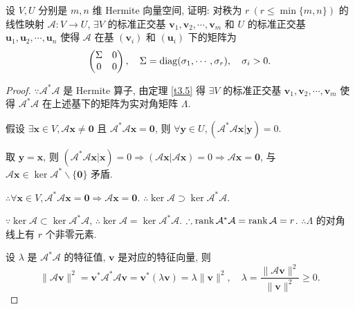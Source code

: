 \documentclass{ctexart}
\begin{document}
\begin{exercisec}%
    设 $V,U$ 分别是 $m,n$ 维 Hermite 向量空间, 证明: 对秩为 $r\ (r\leq\min\{m,n\})$ 的线性映射 $\mathcal{A}:V\to U$, $\exists V$ 的标准正交基 $\boldsymbol{v}_1,\boldsymbol{v}_2,\cdots,\boldsymbol{v}_m$ 和 $U$ 的标准正交基 $\boldsymbol{u}_1,\boldsymbol{u}_2,\cdots,\boldsymbol{u}_n$ 使得 $\mathcal{A}$ 在基 $(\boldsymbol{v}_i)$ 和 $(\boldsymbol{u}_i)$ 下的矩阵为
    \[\begin{pmatrix}
        \Sigma & 0 \\
        0 & 0 \\
    \end{pmatrix},\quad\Sigma=\operatorname{diag} (\sigma_1,\cdots,\sigma_r),\quad\sigma_i>0.\]
\end{exercisec}
\begin{proof}
    $\because\mathcal{A}^*\mathcal{A}$ 是 Hermite 算子, 由定理 \ref{t3.5} 得 $\exists V$ 的标准正交基 $\boldsymbol{v}_1,\boldsymbol{v}_2,\cdots,\boldsymbol{v}_m$ 使得 $\mathcal{A}^*\mathcal{A}$ 在上述基下的矩阵为实对角矩阵 $\Lambda$.

    假设 $\exists\boldsymbol{x}\in V,\mathcal{A}\boldsymbol{x}\neq\boldsymbol{0}$ 且 $\mathcal{A}^*\mathcal{A}\boldsymbol{x}=\boldsymbol{0}$, 则 $\forall\boldsymbol{y}\in U,(\mathcal{A}^*\mathcal{A}\boldsymbol{x}|\boldsymbol{y})=0$.

    取 $\boldsymbol{y}=\boldsymbol{x}$, 则 $(\mathcal{A}^*\mathcal{A}\boldsymbol{x}|\boldsymbol{x})=0\Rightarrow(\mathcal{A}\boldsymbol{x}|\mathcal{A}\boldsymbol{x})=0\Rightarrow\mathcal{A}\boldsymbol{x}=\boldsymbol{0}$, 与 $\mathcal{A}\boldsymbol{x}\in\ker\mathcal{A}^*\backslash\{\boldsymbol{0}\}$ 矛盾.
    
    $\therefore\forall\boldsymbol{x}\in V,\mathcal{A}^*\mathcal{A}\boldsymbol{x}=\boldsymbol{0}\Rightarrow\mathcal{A}\boldsymbol{x}=\boldsymbol{0}$. $\therefore\ker\mathcal{A}\supset\ker\mathcal{A}^*\mathcal{A}$.

    $\because\ker\mathcal{A}\subset\ker\mathcal{A}^*\mathcal{A}$, $\therefore\ker\mathcal{A}=\ker\mathcal{A}^*\mathcal{A}$. $\therefore\operatorname{rank} \mathcal{A}^*\mathcal{A}=\operatorname{rank} \mathcal{A}=r$. $\therefore\Lambda$ 的对角线上有 $r$ 个非零元素.

    设 $\lambda$ 是 $\mathcal{A}^*\mathcal{A}$ 的特征值, $\boldsymbol{v}$ 是对应的特征向量, 则
    \[\|\mathcal{A}\boldsymbol{v}\|^2=\boldsymbol{v}^*\mathcal{A}^*\mathcal{A}\boldsymbol{v}=\boldsymbol{v}^*(\lambda\boldsymbol{v})=\lambda\|\boldsymbol{v}\|^2,\quad\lambda=\dfrac{\|\mathcal{A}\boldsymbol{v}\|^2}{\|\boldsymbol{v}\|^2}\geq0.\]


\end{proof}
\end{document}
